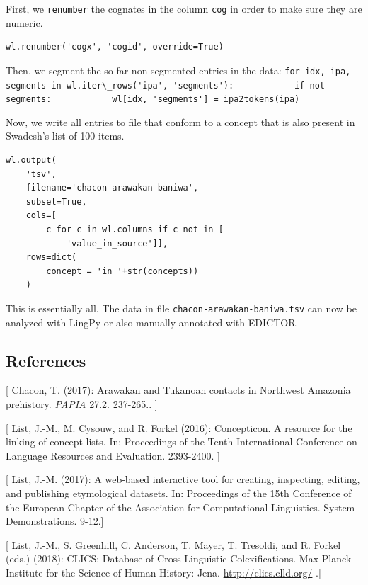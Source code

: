 \documentclass[
  english,
  a4paper,
  oneside,tablecaptionabove
]{scrbook}
\newcommand{\passthrough}[1]{#1}
\begin{document}
First, we \passthrough{\lstinline!renumber!} the cognates in the column
\passthrough{\lstinline!cog!} in order to make sure they are numeric.

\begin{lstlisting}
wl.renumber('cogx', 'cogid', override=True)
\end{lstlisting}

Then, we segment the so far non-segmented entries in the data:
\passthrough{\lstinline!for idx, ipa, segments in wl.iter\_rows('ipa', 'segments'):            if not segments:            wl[idx, 'segments'] = ipa2tokens(ipa)!}

Now, we write all entries to file that conform to a concept that is also
present in Swadesh's list of 100 items.

\begin{lstlisting}
wl.output(
    'tsv', 
    filename='chacon-arawakan-baniwa', 
    subset=True, 
    cols=[
        c for c in wl.columns if c not in [
            'value_in_source']],
    rows=dict(
        concept = 'in '+str(concepts))
    )
\end{lstlisting}

This is essentially all. The data in file
\passthrough{\lstinline!chacon-arawakan-baniwa.tsv!} can now be analyzed
with LingPy or also manually annotated with EDICTOR.

\hypertarget{references-7}{%
\subsection*{References}\label{references-7}}

{[} Chacon, T. (2017): Arawakan and Tukanoan contacts in Northwest
Amazonia prehistory. \emph{PAPIA} 27.2. 237-265.. {]}

{[} List, J.-M., M. Cysouw, and R. Forkel (2016): Concepticon. A
resource for the linking of concept lists. In: Proceedings of the Tenth
International Conference on Language Resources and Evaluation.
2393-2400. {]}

{[} List, J.-M. (2017): A web-based interactive tool for creating,
inspecting, editing, and publishing etymological datasets. In:
Proceedings of the 15th Conference of the European Chapter of the
Association for Computational Linguistics. System Demonstrations.
9-12.{]}

{[} List, J.-M., S. Greenhill, C. Anderson, T. Mayer, T. Tresoldi, and
R. Forkel (eds.) (2018): CLICS: Database of Cross-Linguistic
Colexifications. Max Planck Institute for the Science of Human History:
Jena. \href{//clics.clld.org/”}{http://clics.clld.org/} .{]}
\end{document}
